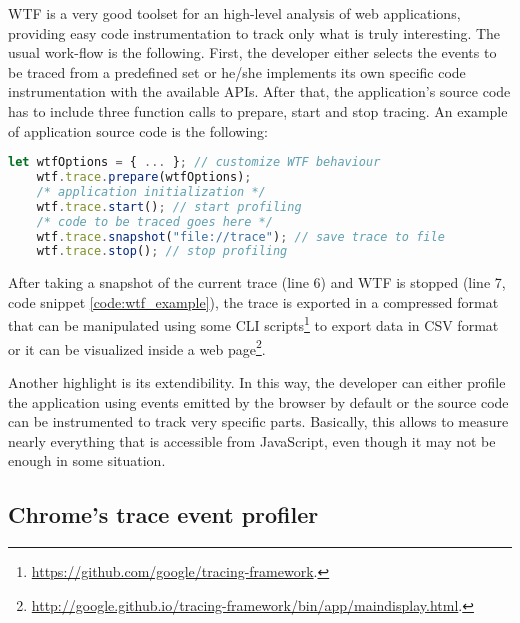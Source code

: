 WTF is a very good toolset for an high-level analysis of web applications,
providing easy code instrumentation to track only what is truly interesting.
The usual work-flow is the following. First, the developer either selects the events
to be traced from a predefined set or he/she implements its own specific code
instrumentation with the available APIs. After that, the application's source code
has to include three function calls to prepare, start and stop tracing.
An example of application source code is the following:
\begin{lstlisting}[caption=Usage example of the Web Tracing Framework., language=JavaScript,
    label=code:wtf_example]
    let wtfOptions = { ... }; // customize WTF behaviour
    wtf.trace.prepare(wtfOptions);
    /* application initialization */
    wtf.trace.start(); // start profiling
    /* code to be traced goes here */
    wtf.trace.snapshot("file://trace"); // save trace to file
    wtf.trace.stop(); // stop profiling
\end{lstlisting}

After taking a snapshot of the current trace (line 6) and WTF is stopped (line 7,
code snippet \ref{code:wtf_example}), the trace is exported in a
compressed format that can be manipulated using some CLI
scripts\footnote{\url{https://github.com/google/tracing-framework}.} to export
data in CSV format or it can be visualized inside a web
page\footnote{\url{http://google.github.io/tracing-framework/bin/app/maindisplay.html}.}.

Another highlight is its extendibility. In this way, the developer can either
profile the application using events emitted by the browser by default or the
source code can be instrumented to track very specific parts. Basically, this
allows to measure nearly everything that is accessible from JavaScript, even
though it may not be enough in some situation.



\subsection{Chrome's trace event profiler}




